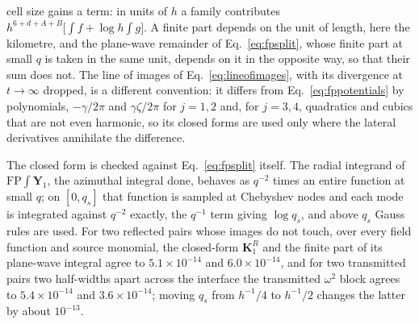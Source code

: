 \documentclass[11pt,a4paper]{article}
\newcommand{\bK}{\mathbf{K}}
\begin{document}
cell size gains a term: in units of $h$ a family contributes $h^{6+d+A+B}\bigl[\int f+\log h\int g\bigr]$. A
finite part depends on the unit of length, here the kilometre, and the plane-wave remainder of
Eq.~\eqref{eq:fpsplit}, whose finite part at small $q$ is taken in the same unit, depends on it in the opposite
way, so that their sum does not. The line of images of Eq.~\eqref{eq:lineofimages}, with its divergence at
$t\to\infty$ dropped, is a different convention: it differs from Eq.~\eqref{eq:fppotentials} by polynomials,
$-\gamma/2\pi$ and $\gamma\zeta/2\pi$ for $j=1,2$ and, for $j=3,4$, quadratics and cubics that are not even
harmonic, so its closed forms are used only where the lateral derivatives annihilate the difference.

The closed form is checked against Eq.~\eqref{eq:fpsplit} itself. The radial integrand of
$\mathrm{FP}\!\int\mathbf Y_1$, the azimuthal integral done, behaves as $q^{-2}$ times an entire function at
small $q$; on $[0,q_s]$ that function is sampled at Chebyshev nodes and each mode is integrated against
$q^{-2}$ exactly, the $q^{-1}$ term giving $\log q_s$, and above $q_s$ Gauss rules are used. For two reflected
pairs whose images do not touch, over every field function and source monomial, the closed-form $\bK^R_1$ and
the finite part of its plane-wave integral agree to $5.1\times10^{-14}$ and $6.0\times10^{-14}$, and for two
transmitted pairs two half-widths apart across the interface the transmitted $\omega^2$ block agrees to
$5.4\times10^{-14}$ and $3.6\times10^{-14}$; moving $q_s$ from $h^{-1}/4$ to $h^{-1}/2$ changes the latter by
about $10^{-13}$. 
\end{document}
